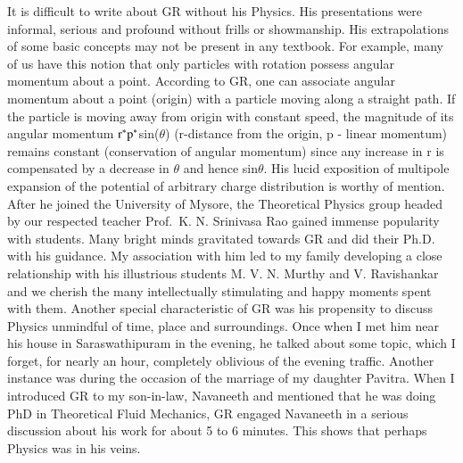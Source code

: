 It is difficult to write about GR without his Physics. His presentations were informal, serious and profound without frills or showmanship. His extrapolations of some basic concepts may not be present in any textbook. For example, many of us have this notion that only particles with rotation possess angular momentum about a point. According to GR, one can associate angular momentum about a point (origin) with a particle moving along a straight path.  If the particle is moving away from origin with constant speed, the magnitude of its angular momentum ${\rm r}^{\ast}{\rm p}^{\ast}$sin($\theta$) (r-distance from the origin, p - linear momentum) remains constant (conservation of angular momentum) since any increase in r is compensated by a decrease in $\theta$ and hence sin$\theta$. His lucid exposition of multipole expansion of the potential of arbitrary charge distribution is worthy of mention. After he joined the University of Mysore, the Theoretical Physics group headed by our respected teacher Prof.\ K. N. Srinivasa Rao gained immense popularity with students. Many bright minds gravitated towards GR and did their Ph.D. with his guidance. My association with him led to my family developing a close relationship with his illustrious students M. V. N. Murthy and V. Ravishankar and we cherish the many intellectually stimulating and happy moments spent with them. Another special characteristic of GR was his propensity to discuss Physics unmindful of time, place and surroundings. Once when I met him near his house in Saraswathipuram in the evening, he talked about some topic, which I forget, for nearly an hour, completely oblivious of the evening traffic. Another instance was during the occasion of the marriage of my daughter Pavitra. When I introduced GR to my son-in-law, Navaneeth and mentioned that he was doing PhD in Theoretical Fluid Mechanics, GR engaged Navaneeth in a serious discussion about his work for about 5 to 6 minutes. This shows that perhaps Physics was in his veins.

